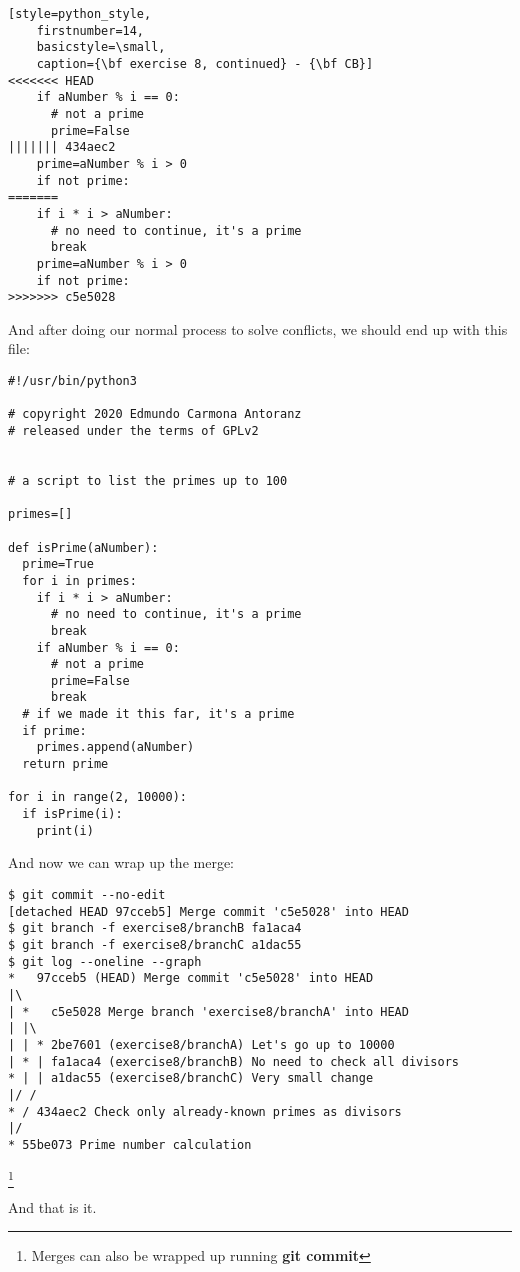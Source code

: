 \begin{lstlisting}[style=python_style,
	firstnumber=14,
	basicstyle=\small,
	caption={\bf exercise 8, continued} - {\bf CB}]
<<<<<<< HEAD
    if aNumber % i == 0:
      # not a prime
      prime=False
||||||| 434aec2
    prime=aNumber % i > 0
    if not prime:
=======
    if i * i > aNumber:
      # no need to continue, it's a prime
      break
    prime=aNumber % i > 0
    if not prime:
>>>>>>> c5e5028
\end{lstlisting}

And after doing our normal process to solve conflicts, we should end up with this file:
\begin{lstlisting}[style=python_style,
	basicstyle=\small,
	caption={\bf exercise 8, continued} - solved conflict]
#!/usr/bin/python3

# copyright 2020 Edmundo Carmona Antoranz
# released under the terms of GPLv2


# a script to list the primes up to 100

primes=[]

def isPrime(aNumber):
  prime=True
  for i in primes:
    if i * i > aNumber:
      # no need to continue, it's a prime
      break
    if aNumber % i == 0:
      # not a prime
      prime=False
      break
  # if we made it this far, it's a prime
  if prime:
    primes.append(aNumber)
  return prime

for i in range(2, 10000):
  if isPrime(i):
    print(i)
\end{lstlisting}

And now we can wrap up the merge:

\begin{lstlisting}[style=console_style,
	basicstyle=\small,
	caption={\bf exercise 8, continued} - wrap merge]
$ git commit --no-edit
[detached HEAD 97cceb5] Merge commit 'c5e5028' into HEAD
$ git branch -f exercise8/branchB fa1aca4
$ git branch -f exercise8/branchC a1dac55
$ git log --oneline --graph
*   97cceb5 (HEAD) Merge commit 'c5e5028' into HEAD
|\  
| *   c5e5028 Merge branch 'exercise8/branchA' into HEAD
| |\  
| | * 2be7601 (exercise8/branchA) Let's go up to 10000
| * | fa1aca4 (exercise8/branchB) No need to check all divisors
* | | a1dac55 (exercise8/branchC) Very small change
|/ /  
* / 434aec2 Check only already-known primes as divisors
|/  
* 55be073 Prime number calculation
\end{lstlisting}\footnote{Merges can also be wrapped up running {\bf git commit}}

And that is it.
